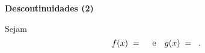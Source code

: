 \documentclass[oneside,12pt]{article}
\begin{document}
\newpage



{\bf Descontinuidades (2)}

\pu

\unitlength=10pt

Sejam
%
$$f(x) \;=\; \ga{Parabola complicada}
  \quad
  \text{e}
  \quad
  g(x) \;=\; \ga{Parabola complicada 2}
  \; .
$$
\end{document}
